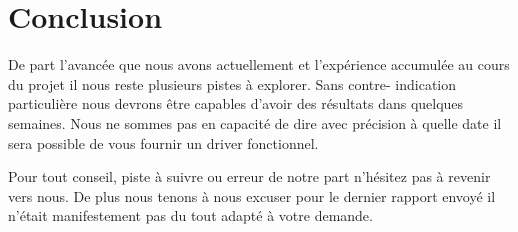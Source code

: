 
\chapter{Conclusion} %

\label{Chapter6} %


De part l’avancée que nous avons actuellement et l’expérience accumulée au
cours du projet il nous reste plusieurs pistes à explorer. Sans contre-
indication particulière nous devrons être capables d’avoir des résultats dans
quelques semaines. Nous ne sommes pas en capacité de
dire avec précision à quelle date il sera possible de vous fournir un driver
fonctionnel.

Pour tout conseil, piste à suivre ou erreur de notre part n’hésitez pas à
revenir vers nous. De plus nous tenons à nous excuser pour le dernier rapport
envoyé il n’était manifestement pas du tout adapté à votre demande.
